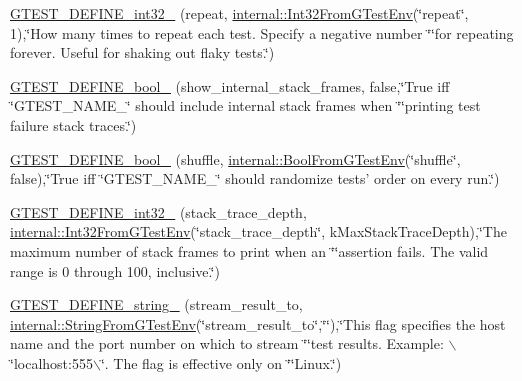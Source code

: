 \begin{DoxyCompactItemize}
\item 
\hyperlink{namespacetesting_a50b0b832aca7fb92c276a1e3d31e050c}{\-G\-T\-E\-S\-T\-\_\-\-D\-E\-F\-I\-N\-E\-\_\-int32\-\_\-} (repeat, \hyperlink{namespacetesting_1_1internal_a960e275ac93c373f223887e57ec54381}{internal\-::\-Int32\-From\-G\-Test\-Env}(\char`\"{}repeat\char`\"{}, 1),\char`\"{}\-How many times to repeat each test.  \-Specify a negative number \char`\"{}\char`\"{}for repeating forever.  \-Useful for shaking out flaky tests.\char`\"{})
\item 
\hyperlink{namespacetesting_a5d2d141aaea64f415e0c06dac562cfc3}{\-G\-T\-E\-S\-T\-\_\-\-D\-E\-F\-I\-N\-E\-\_\-bool\-\_\-} (show\-\_\-internal\-\_\-stack\-\_\-frames, false,\char`\"{}\-True iff \char`\"{}\-G\-T\-E\-S\-T\-\_\-\-N\-A\-M\-E\-\_\-\char`\"{} should include internal stack frames when \char`\"{}\char`\"{}printing test failure stack traces.\char`\"{})
\item 
\hyperlink{namespacetesting_a279842981ac3331c373ebcdcee0cfb95}{\-G\-T\-E\-S\-T\-\_\-\-D\-E\-F\-I\-N\-E\-\_\-bool\-\_\-} (shuffle, \hyperlink{namespacetesting_1_1internal_af17bf74326e1076c47455ef2618c1a1a}{internal\-::\-Bool\-From\-G\-Test\-Env}(\char`\"{}shuffle\char`\"{}, false),\char`\"{}\-True iff \char`\"{}\-G\-T\-E\-S\-T\-\_\-\-N\-A\-M\-E\-\_\-\char`\"{} should randomize tests' order on every run.\char`\"{})
\item 
\hyperlink{namespacetesting_a18e317789f8ddb3b7a828ef8587f098e}{\-G\-T\-E\-S\-T\-\_\-\-D\-E\-F\-I\-N\-E\-\_\-int32\-\_\-} (stack\-\_\-trace\-\_\-depth, \hyperlink{namespacetesting_1_1internal_a960e275ac93c373f223887e57ec54381}{internal\-::\-Int32\-From\-G\-Test\-Env}(\char`\"{}stack\-\_\-trace\-\_\-depth\char`\"{}, k\-Max\-Stack\-Trace\-Depth),\char`\"{}\-The maximum number of stack frames to print when an \char`\"{}\char`\"{}assertion fails.  \-The valid range is 0 through 100, inclusive.\char`\"{})
\item 
\hyperlink{namespacetesting_a8755450a9b287a52c02a3f1686df648c}{\-G\-T\-E\-S\-T\-\_\-\-D\-E\-F\-I\-N\-E\-\_\-string\-\_\-} (stream\-\_\-result\-\_\-to, \hyperlink{namespacetesting_1_1internal_a0154be115eea16783f82d3642ff27940}{internal\-::\-String\-From\-G\-Test\-Env}(\char`\"{}stream\-\_\-result\-\_\-to\char`\"{},\char`\"{}\char`\"{}),\char`\"{}\-This flag specifies the host name and the port number on which to stream \char`\"{}\char`\"{}test results. \-Example\-: $\backslash$\char`\"{}localhost\-:555$\backslash$\char`\"{}. \-The flag is effective only on \char`\"{}\char`\"{}\-Linux.\char`\"{})
\item 

\end{DoxyCompactItemize}
